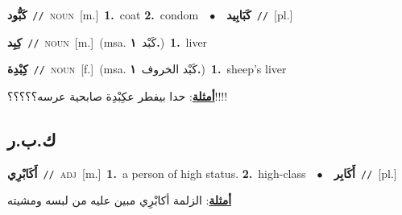 \documentclass[10pt,a4paper,twoside]{article} %
\begin{document}
\begin{multicols}{2}
{{{{{{{{{\setlength\topsep{0pt}\textbf{\foreignlanguage{arabic}{كَبُّود}}\ {\color{gray}\texttt{//}\color{black}}\ \textsc{noun}\ [m.]\ \textbf{1.}~coat  \textbf{2.}~condom\ \ $\bullet$\ \ \setlength\topsep{0pt}\textbf{\foreignlanguage{arabic}{كَبَابِيد}}\ {\color{gray}\texttt{//}\color{black}}\ [pl.]\ 

{\setlength\topsep{0pt}\textbf{\foreignlanguage{arabic}{كِبِد}}\ {\color{gray}\texttt{//}\color{black}}\ \textsc{noun}\ [m.]\ \color{gray}(msa. \foreignlanguage{arabic}{كَبْد}~\foreignlanguage{arabic}{\textbf{١.}})\color{black}\ \textbf{1.}~liver\ 

{\setlength\topsep{0pt}\textbf{\foreignlanguage{arabic}{كِبْدِة}}\ {\color{gray}\texttt{//}\color{black}}\ \textsc{noun}\ [f.]\ \color{gray}(msa. \foreignlanguage{arabic}{كَبْد الخروف}~\foreignlanguage{arabic}{\textbf{١.}})\color{black}\ \textbf{1.}~sheep's liver\  \begin{flushright}\color{gray}\foreignlanguage{arabic}{\textbf{\underline{\foreignlanguage{arabic}{أمثلة}}}: حدا بيفطر عكِبْدِة صابحية عرسه؟؟؟؟؟!!!!}\end{flushright}\color{black}} \vspace{2mm}

\vspace{-3mm}
\subsection*{\color{blue}\foreignlanguage{arabic}{ك.ب.ر}\color{blue}{}} 

{\setlength\topsep{0pt}\textbf{\foreignlanguage{arabic}{أَكَابْرِي}}\ {\color{gray}\texttt{//}\color{black}}\ \textsc{adj}\ [m.]\ \textbf{1.}~a person of high status.  \textbf{2.}~high-class\ \ $\bullet$\ \ \setlength\topsep{0pt}\textbf{\foreignlanguage{arabic}{أَكَابِر}}\ {\color{gray}\texttt{//}\color{black}}\ [pl.]\  \begin{flushright}\color{gray}\foreignlanguage{arabic}{\textbf{\underline{\foreignlanguage{arabic}{أمثلة}}}: الزلمة أكابْرِي مبين عليه من لبسه ومشيته}\end{flushright}\color{black}} \vspace{2mm}

}}}}}}}}}}
\end{multicols}
\end{document}
